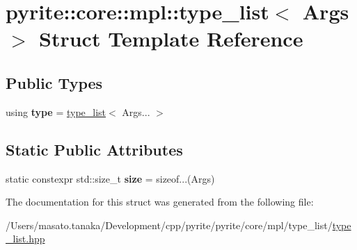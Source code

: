 \hypertarget{structpyrite_1_1core_1_1mpl_1_1type__list}{}\section{pyrite\+:\+:core\+:\+:mpl\+:\+:type\+\_\+list$<$ Args $>$ Struct Template Reference}
\label{structpyrite_1_1core_1_1mpl_1_1type__list}
\subsection*{Public Types}
\begin{DoxyCompactItemize}
\item 
\mbox{\label{structpyrite_1_1core_1_1mpl_1_1type__list_ae35eb4f4ab39374f2786c1b1b933327f}} 
using {\bfseries type} = \mbox{\hyperlink{structpyrite_1_1core_1_1mpl_1_1type__list}{type\+\_\+list}}$<$ Args... $>$
\end{DoxyCompactItemize}
\subsection*{Static Public Attributes}
\begin{DoxyCompactItemize}
\item 
\mbox{\label{structpyrite_1_1core_1_1mpl_1_1type__list_a13b8657c429b51b70c2c41485d90801d}} 
static constexpr std\+::size\+\_\+t {\bfseries size} = sizeof...(Args)
\end{DoxyCompactItemize}


The documentation for this struct was generated from the following file\+:\begin{DoxyCompactItemize}
\item 
/\+Users/masato.\+tanaka/\+Development/cpp/pyrite/pyrite/core/mpl/type\+\_\+list/\mbox{\hyperlink{core_2mpl_2type__list_2type__list_8hpp}{type\+\_\+list.\+hpp}}\end{DoxyCompactItemize}
